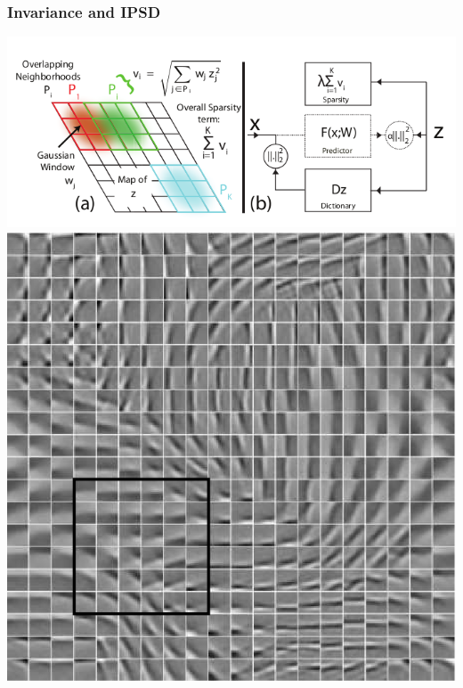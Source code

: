 \documentclass{beamer}
\begin{document}
\begin{frame}
\frametitle{Invariance and IPSD}
\begin{center}
\includegraphics[scale = 0.3]{PSD2.png} \\
\includegraphics[scale = 0.2]{PSD.png} 
\end{center} 
\end{frame} 
\end{document}
